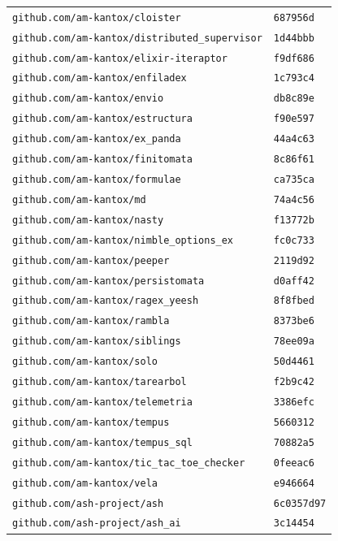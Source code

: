 \begin{longtable}{@{}p{} l@{}}
\texttt{github.com/am-kantox/cloister} & \texttt{687956d} \\
\texttt{github.com/am-kantox/distributed\_supervisor} & \texttt{1d44bbb} \\
\texttt{github.com/am-kantox/elixir-iteraptor} & \texttt{f9df686} \\
\texttt{github.com/am-kantox/enfiladex} & \texttt{1c793c4} \\
\texttt{github.com/am-kantox/envio} & \texttt{db8c89e} \\
\texttt{github.com/am-kantox/estructura} & \texttt{f90e597} \\
\texttt{github.com/am-kantox/ex\_panda} & \texttt{44a4c63} \\
\texttt{github.com/am-kantox/finitomata} & \texttt{8c86f61} \\
\texttt{github.com/am-kantox/formulae} & \texttt{ca735ca} \\
\texttt{github.com/am-kantox/md} & \texttt{74a4c56} \\
\texttt{github.com/am-kantox/nasty} & \texttt{f13772b} \\
\texttt{github.com/am-kantox/nimble\_options\_ex} & \texttt{fc0c733} \\
\texttt{github.com/am-kantox/peeper} & \texttt{2119d92} \\
\texttt{github.com/am-kantox/persistomata} & \texttt{d0aff42} \\
\texttt{github.com/am-kantox/ragex\_yeesh} & \texttt{8f8fbed} \\
\texttt{github.com/am-kantox/rambla} & \texttt{8373be6} \\
\texttt{github.com/am-kantox/siblings} & \texttt{78ee09a} \\
\texttt{github.com/am-kantox/solo} & \texttt{50d4461} \\
\texttt{github.com/am-kantox/tarearbol} & \texttt{f2b9c42} \\
\texttt{github.com/am-kantox/telemetria} & \texttt{3386efc} \\
\texttt{github.com/am-kantox/tempus} & \texttt{5660312} \\
\texttt{github.com/am-kantox/tempus\_sql} & \texttt{70882a5} \\
\texttt{github.com/am-kantox/tic\_tac\_toe\_checker} & \texttt{0feeac6} \\
\texttt{github.com/am-kantox/vela} & \texttt{e946664} \\
\texttt{github.com/ash-project/ash} & \texttt{6c0357d97} \\
\texttt{github.com/ash-project/ash\_ai} & \texttt{3c14454} \\

\end{longtable}
